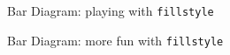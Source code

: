 \documentclass[12pt]{article}
\begin{document}
\begin{figure}[t]
  \begin{minipage}[t]{\textwidth}
   \parbox[b]{\textwidth}{%
    \centering
    
   }
  \end{minipage}
\caption{\label{fig:9}Bar Diagram: playing with \texttt{fillstyle}}
\end{figure}

\begin{figure}[t]
  \begin{minipage}[t]{\textwidth}
   \parbox[b]{\textwidth}{%
    \centering
    
   }
  \end{minipage}
\caption{\label{fig:10}Bar Diagram: more fun with \texttt{fillstyle}}
\end{figure}
\end{document}
